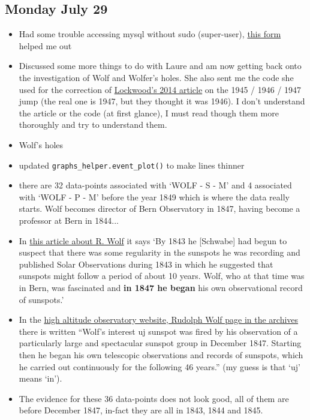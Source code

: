\documentclass[12pt]{article}
\begin{document}
\subsection{Monday July 29}
\begin{itemize}
    \item Had some trouble accessing mysql without sudo (super-user), \href{https://askubuntu.com/questions/766334/cant-login-as-mysql-user-root-from-normal-user-account-in-ubuntu-16-04}{this form} helped me out
    \item Discussed some more things to do with Laure and am now getting back onto the investigation of Wolf and Wolfer's holes. She also sent me the code she used for the correction of \href{https://agupubs.onlinelibrary.wiley.com/doi/10.1002/2014JA019970}{Lockwood's 2014 article} on the 1945 / 1946 / 1947 jump (the real one is 1947, but they thought it was 1946). I don't understand the article or the code (at first glance), I must read though them more thoroughly and try to understand them.
    \item Wolf's holes
    \item updated \texttt{graphs\_helper.event\_plot()} to make lines thinner
    \item there are 32 data-points associated with `WOLF - S - M' and 4 associated with `WOLF - P - M' before the year 1849 which is where the data really starts. Wolf becomes director of Bern Observatory in 1847, having become a professor at Bern in 1844...
    \item In \href{http://www-history.mcs.st-andrews.ac.uk/Biographies/Wolf.html}{this article about R. Wolf} it says `By 1843 he [Schwabe] had begun to suspect that there was some regularity in the sunspots he was recording and published Solar Observations during 1843 in which he suggested that sunspots might follow a period of about 10 years. Wolf, who at that time was in Bern, was fascinated and \textbf{in 1847 he began} his own observational record of sunspots.'
    \item In the \href{https://web.archive.org/web/20091106184834/http://www.hao.ucar.edu/education/bios/wolf.php}{high altitude observatory website, Rudolph Wolf page in the archives} there is written ``Wolf's interest uj sunspot was fired by his observation of a particularly large and spectacular sunspot group in December 1847. Starting then he began his own telescopic observations and records of sunspots, which he carried out continuously for the following 46 years.'' (my guess is that `uj' means `in').
    \item The evidence for these 36 data-points does not look good, all of them are before December 1847, in-fact they are all in 1843, 1844 and 1845. 

\end{itemize}
\end{document}
